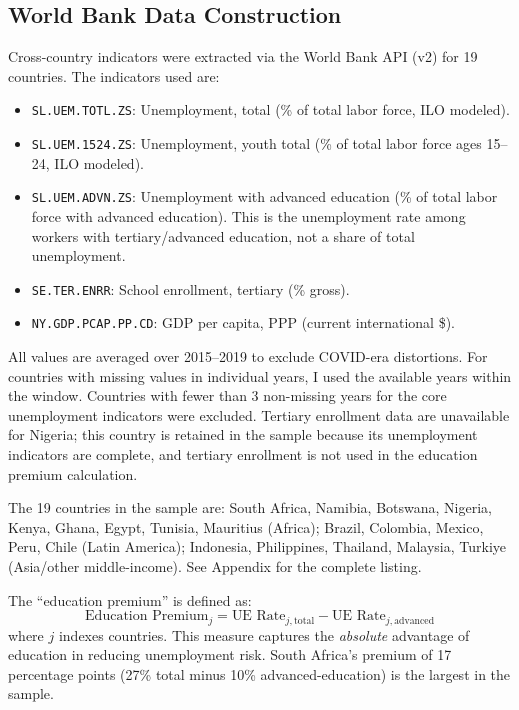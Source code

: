 \documentclass[12pt]{article}
\begin{document}
\subsection{World Bank Data Construction}

Cross-country indicators were extracted via the World Bank API (v2) for 19 countries. The indicators used are:

\begin{itemize}
    \item \texttt{SL.UEM.TOTL.ZS}: Unemployment, total (\% of total labor force, ILO modeled).
    \item \texttt{SL.UEM.1524.ZS}: Unemployment, youth total (\% of total labor force ages 15--24, ILO modeled).
    \item \texttt{SL.UEM.ADVN.ZS}: Unemployment with advanced education (\% of total labor force with advanced education). This is the unemployment rate among workers with tertiary/advanced education, not a share of total unemployment.
    \item \texttt{SE.TER.ENRR}: School enrollment, tertiary (\% gross).
    \item \texttt{NY.GDP.PCAP.PP.CD}: GDP per capita, PPP (current international \$).
\end{itemize}

All values are averaged over 2015--2019 to exclude COVID-era distortions. For countries with missing values in individual years, I used the available years within the window. Countries with fewer than 3 non-missing years for the core unemployment indicators were excluded. Tertiary enrollment data are unavailable for Nigeria; this country is retained in the sample because its unemployment indicators are complete, and tertiary enrollment is not used in the education premium calculation.

The 19 countries in the sample are: South Africa, Namibia, Botswana, Nigeria, Kenya, Ghana, Egypt, Tunisia, Mauritius (Africa); Brazil, Colombia, Mexico, Peru, Chile (Latin America); Indonesia, Philippines, Thailand, Malaysia, Turkiye (Asia/other middle-income). See Appendix  for the complete listing.

The ``education premium'' is defined as:
\[
\text{Education Premium}_j = \text{UE Rate}_{j,\text{total}} - \text{UE Rate}_{j,\text{advanced}}
\]
where $j$ indexes countries. This measure captures the \emph{absolute} advantage of education in reducing unemployment risk. South Africa's premium of 17 percentage points (27\% total minus 10\% advanced-education) is the largest in the sample.
\end{document}
